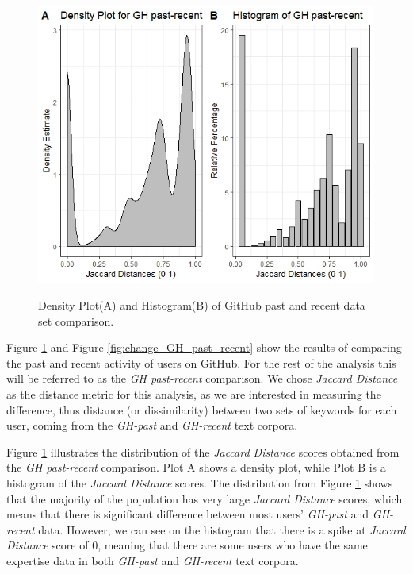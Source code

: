         \begin{figure}
          \centering
          \includegraphics[width=\textwidth]{figures/GH_past-recent.jpeg}\\
          \caption{Density Plot(A) and Histogram(B) of GitHub past and recent data set comparison.}
          \label{fig:GH_past_recent}
        \end{figure}
        
        Figure \ref{fig:GH_past_recent} and Figure \ref{fig:change_GH_past_recent} show the results of comparing the past and recent activity of users on GitHub. For the rest of the analysis this will be referred to as the \emph{GH past-recent} comparison. We chose \emph{Jaccard Distance} as the distance metric for this analysis, as we are interested in measuring the difference, thus distance (or dissimilarity) between two sets of keywords for each user, coming from the \emph{GH-past} and \emph{GH-recent} text corpora. 
        
        Figure \ref{fig:GH_past_recent} illustrates the distribution of the \emph{Jaccard Distance} scores obtained from the \emph{GH past-recent} comparison. Plot A shows a density plot, while Plot B is a histogram of the \emph{Jaccard Distance} scores. The distribution from Figure \ref{fig:GH_past_recent} shows that the majority of the population has very large \emph{Jaccard Distance} scores, which means that there is significant difference between most users' \emph{GH-past} and \emph{GH-recent} data. However, we can see on the histogram that there is a spike at \emph{Jaccard Distance} score of 0, meaning that there are some users who have the same expertise data in both \emph{GH-past} and \emph{GH-recent} text corpora.
        
